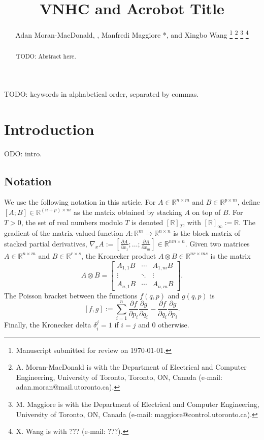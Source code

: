 \documentclass[journal,twoside,web]{ieeecolor}
\newcommand*{\Title}{VNHC and Acrobot Title}
\newcommand*{\Rt}[1]{[\R]_{#1}}
\newcommand*{\R}{\mathbb{R}}
\newcommand*{\pdiff}[2]{\frac{\partial #1}{\partial #2}}
\begin{document}
\title{\Title}
\author{Adan Moran-MacDonald, , Manfredi Maggiore
*, and Xingbo Wang
\thanks{Manuscript submitted for review on \today.}
\thanks{A. Moran-MacDonald is with the Department of Electrical and Computer
    Engineering, University of Toronto, Toronto, ON, Canada (e-mail:
adan.moran@mail.utoronto.ca).}
\thanks{M. Maggiore is with the Department of Electrical and Computer
Engineering, University of Toronto, ON, Canada (e-mail:
maggiore@control.utoronto.ca).}
\thanks{X. Wang is with ??? (e-mail: ???).}
} %

\maketitle

\begin{abstract}
TODO: Abstract here.
\end{abstract}

\begin{IEEEkeywords}
TODO: keywords in alphabetical order, separated by commas.
\end{IEEEkeywords}

\section{Introduction}\label{sec:introduction}
ODO: intro.

\subsection{Notation}
We use the following notation in this article.
For \(A \in \R^{n\times m}\) and \(B \in \R^{p \times m}\),
define \([A;B] \in \R^{(n+p)\times m}\) as the matrix obtained by stacking \(A\)
on top of \(B\). 
For \(T > 0\), the set of real numbers modulo \(T\) is denoted \(\Rt{T}\), with
\(\Rt{\infty} := \R\).
The gradient of the matrix-valued function 
\(A : \R^m \rightarrow \R^{n\times n}\) is the block matrix of stacked partial
derivatives, 
\(\nabla_xA := [\pdiff{A}{x_1};\ldots;\pdiff{A}{x_m}] \in \R^{nm \times n}\).
Given two matrices \(A \in \R^{n \times m}\) and \(B \in \R^{r \times s}\), the
Kronecker product \cite{kronprod} \(A \otimes B \in \R^{nr \times ms}\) is the
matrix
\begin{equation}\label{eqn:kronprod}
    A \otimes B = \begin{bmatrix}
        A_{1,1}B & \cdots & A_{1,m} B \\
        \vdots & \ddots & \vdots \\
        A_{n,1} B & \cdots & A_{n,m} B
    \end{bmatrix} 
    .
\end{equation}
The Poisson bracket \cite{landau_mechanics} between the functions
\(f(q,p)\) and \(g(q,p)\) is
\begin{equation}\label{eqn:poisson-bracket}
    [f,g] := \sum \limits_{i=1}^n \pdiff{f}{p_i}\pdiff{g}{q_i} - 
        \pdiff{f}{q_i}\pdiff{g}{p_i}
    .
\end{equation}
Finally, the Kronecker delta \(\delta_i^j = 1\) if \(i = j\) and \(0\)
otherwise.
\end{document}
